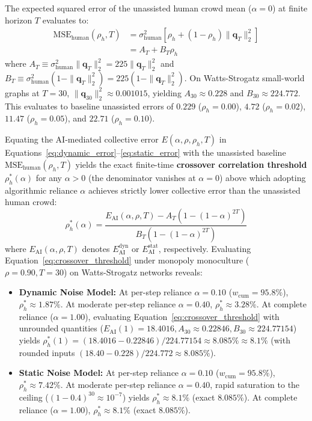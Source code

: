 \documentclass
[letterpaper]{article}
\begin{document}
The expected squared error of the unassisted human crowd mean ($\alpha = 0$) at finite horizon $T$ evaluates to:
\begin{align}
\text{MSE}_{\text{human}}(\rho_h, T) &= \sigma_{\text{human}}^2 \left[\rho_h + (1 - \rho_h) \|\mathbf{q}_T\|_2^2\right] \nonumber \\
&= A_T + B_T \rho_h
\label{eq:human_correlated_mse}
\end{align}
where $A_T \equiv \sigma_{\text{human}}^2 \|\mathbf{q}_T\|_2^2 = 225 \|\mathbf{q}_T\|_2^2$ and $B_T \equiv \sigma_{\text{human}}^2 (1 - \|\mathbf{q}_T\|_2^2) = 225 (1 - \|\mathbf{q}_T\|_2^2)$. On Watts-Strogatz small-world graphs at $T = 30$, $\|\mathbf{q}_{30}\|_2^2 \approx 0.001015$, yielding $A_{30} \approx 0.228$ and $B_{30} \approx 224.772$. This evaluates to baseline unassisted errors of $0.229$ ($\rho_h = 0.00$), $4.72$ ($\rho_h = 0.02$), $11.47$ ($\rho_h = 0.05$), and $22.71$ ($\rho_h = 0.10$).

Equating the AI-mediated collective error $E(\alpha, \rho, \rho_h, T)$ in Equations~\ref{eq:dynamic_error}--\ref{eq:static_error} with the unassisted baseline $\text{MSE}_{\text{human}}(\rho_h, T)$ yields the exact finite-time \textbf{crossover correlation threshold} $\rho_h^*(\alpha)$ for any $\alpha > 0$ (the denominator vanishes at $\alpha = 0$) above which adopting algorithmic reliance $\alpha$ achieves strictly lower collective error than the unassisted human crowd:
\begin{equation}
\rho_h^*(\alpha) = \frac{E_{\text{AI}}(\alpha, \rho, T) - A_T \left(1 - (1 - \alpha)^{2T}\right)}{B_T \left(1 - (1 - \alpha)^{2T}\right)}
\label{eq:crossover_threshold}
\end{equation}
where $E_{\text{AI}}(\alpha, \rho, T)$ denotes $E_{\text{AI}}^{\text{dyn}}$ or $E_{\text{AI}}^{\text{stat}}$, respectively. Evaluating Equation~\ref{eq:crossover_threshold} under monopoly monoculture ($\rho = 0.90, T = 30$) on Watts-Strogatz networks reveals:
\begin{itemize}\setlength{\itemsep}{0pt}\setlength{\parskip}{0pt}\setlength{\parsep}{0pt}
    \item \textbf{Dynamic Noise Model:} At per-step reliance $\alpha = 0.10$ ($w_{\text{cum}} = 95.8\%$), $\rho_h^* \approx 1.87\%$. At moderate per-step reliance $\alpha = 0.40$, $\rho_h^* \approx 3.28\%$. At complete reliance ($\alpha = 1.00$), evaluating Equation~\ref{eq:crossover_threshold} with unrounded quantities ($E_{\text{AI}}(1) = 18.4016, A_{30} \approx 0.22846, B_{30} \approx 224.77154$) yields $\rho_h^*(1) = (18.4016 - 0.22846)/224.77154 \approx 8.085\% \approx 8.1\%$ (with rounded inputs $(18.40 - 0.228)/224.772 \approx 8.085\%$).
    \item \textbf{Static Noise Model:} At per-step reliance $\alpha = 0.10$ ($w_{\text{cum}} = 95.8\%$), $\rho_h^* \approx 7.42\%$. At moderate per-step reliance $\alpha = 0.40$, rapid saturation to the ceiling ($(1-0.4)^{30} \approx 10^{-7}$) yields $\rho_h^* \approx 8.1\%$ (exact $8.085\%$). At complete reliance ($\alpha = 1.00$), $\rho_h^* \approx 8.1\%$ (exact $8.085\%$).
\end{itemize}
\end{document}
